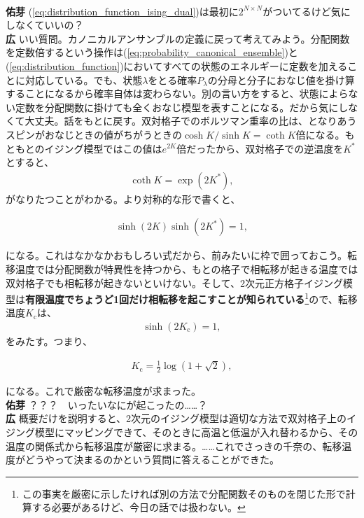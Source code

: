 \documentclass[paper=b5j,fontsize=12Q,jafontsize=12Q,baselineskip=21Q]{jlreq}
\DeclareRobustCommand{\hiron}{\textbf{広 }}
\DeclareRobustCommand{\umen}{\textbf{佑芽 }}
\begin{document}
\begin{refsection}
\\\umen (\ref{eq:distribution_function_ising_dual})は最初に$2^{N\times N}$がついてるけど気にしなくていいの？
\\\hiron いい質問。カノニカルアンサンブルの定義に戻って考えてみよう。分配関数を定数倍するという操作は(\ref{eq:probability_canonical_ensemble})と(\ref{eq:distribution_function})においてすべての状態のエネルギーに定数を加えることに対応している。でも、状態$\lambda$をとる確率$P_\lambda$の分母と分子におなじ値を掛け算することになるから確率自体は変わらない。別の言い方をすると、状態によらない定数を分配関数に掛けても全くおなじ模型を表すことになる。だから気にしなくて大丈夫。話をもとに戻す。双対格子でのボルツマン重率の比は、となりあうスピンがおなじときの値がちがうときの$\cosh K/\sinh K=\coth K$倍になる。もともとのイジング模型ではこの値は$e^{2K}$倍だったから、双対格子での逆温度を$K^\ast$とすると、
\begin{align}
  \coth K=\exp\left(2K^\ast\right),\label{eq:dual_temperature_ising}
\end{align}
がなりたつことがわかる。より対称的な形で書くと、
\begin{tcolorbox}
\begin{align}
  \sinh(2K)\sinh\left(2K^\ast\right)=1,
\end{align}
\end{tcolorbox}
になる。これはなかなかおもしろい式だから、前みたいに枠で囲っておこう。転移温度では分配関数が特異性を持つから、もとの格子で相転移が起きる温度では双対格子でも相転移が起きないといけない。そして、2次元正方格子イジング模型は\textbf{有限温度でちょうど1回だけ相転移を起こすことが知られている}\footnote{この事実を厳密に示したければ別の方法で分配関数そのものを閉じた形で計算する必要があるけど、今日の話では扱わない。}ので、転移温度$K_{\mathrm c}$は、
\begin{align}
  \sinh(2K_{\mathrm c})=1,
\end{align}
をみたす。つまり、
\begin{tcolorbox}
\begin{align}
  K_{\mathrm c}=\frac12\log\left(1+\sqrt2\right),\label{eq:critical_temperature_ising_square}
\end{align}
\end{tcolorbox}
になる。これで厳密な転移温度が求まった。
\\\umen ？？？　いったいなにが起こったの……？
\\\hiron 概要だけを説明すると、2次元のイジング模型は適切な方法で双対格子上のイジング模型にマッピングできて、そのときに高温と低温が入れ替わるから、その温度の関係式から転移温度が厳密に求まる。……これでさっきの千奈の、転移温度がどうやって決まるのかという質問に答えることができた。

\end{refsection}
\end{document}
